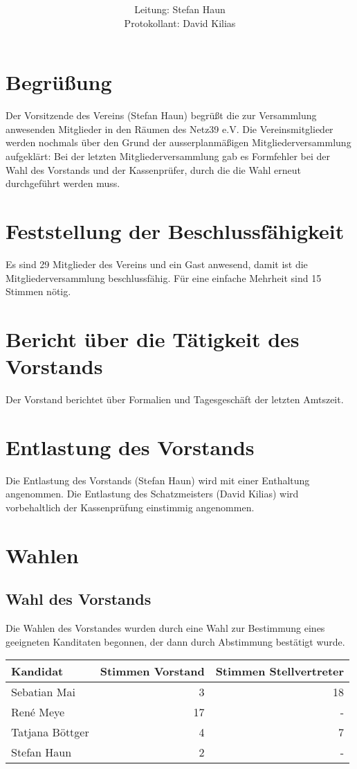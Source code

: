 \documentclass[a4paper,12pt,titlepage]{scrartcl}
\title{ \logo \\ \vspace{0.2\baselineskip} \thetitle}
\author{
Leitung: Stefan Haun \\
Protokollant: David Kilias
}
\date{\displaydate{date}} %
\begin{document}
\maketitle
\tableofcontents

\clearpage
\section*{Begrüßung}
Der Vorsitzende des Vereins (Stefan Haun) begrüßt die zur Versammlung anwesenden Mitglieder in den Räumen des Netz39 e.V.
Die Vereinsmitglieder werden nochmals über den Grund der ausserplanmäßigen Mitgliederversammlung aufgeklärt: Bei der letzten Mitgliederversammlung gab es Formfehler bei der Wahl des Vorstands und der Kassenprüfer, durch die die Wahl erneut durchgeführt werden muss.

\section{Feststellung der Beschlussfähigkeit}
Es sind 29 Mitglieder des Vereins und ein Gast anwesend, damit ist die Mitgliederversammlung beschlussfähig. Für eine einfache Mehrheit sind 15 Stimmen nötig.

\section{Bericht über die Tätigkeit des Vorstands}
Der Vorstand berichtet über Formalien und Tagesgeschäft der letzten Amtszeit.

\section{Entlastung des Vorstands}
Die Entlastung des Vorstands (Stefan Haun) wird mit einer Enthaltung angenommen.
Die Entlastung des Schatzmeisters (David Kilias) wird vorbehaltlich der Kassenprüfung einstimmig angenommen.

\section{Wahlen}
\subsection{Wahl des Vorstands}
Die Wahlen des Vorstandes wurden durch eine Wahl zur Bestimmung eines geeigneten Kanditaten begonnen, der dann durch Abstimmung bestätigt wurde.

\begin{center}
	\begin{tabular}{l | r | r}
			Kandidat & Stimmen Vorstand & Stimmen Stellvertreter \\ \hline
			Sebatian Mai & 3 & 18 \\
			René Meye & 17 & - \\
			Tatjana Böttger & 4 & 7 \\
			Stefan Haun & 2 & - \\
		\end{tabular}
\end{center}
\end{document}
